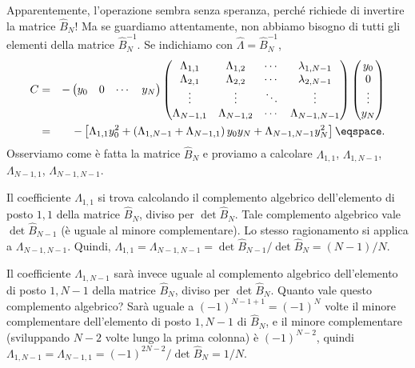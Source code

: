 Apparentemente, l'operazione sembra senza speranza, perch\'e richiede di
invertire la matrice $\hat{B}_{N}$!
Ma se guardiamo attentamente, non abbiamo bisogno di tutti gli elementi della
matrice $\hat{B}_{N}^{-1}$.
Se indichiamo con $\hat{\Lambda} = \hat{B}_{N}^{-1}$, 
\begin{eqnarray*}
C &=&
- \begin{pmatrix}  y_{0} & 0 & \cdots & y_{N} \end{pmatrix} \begin{pmatrix}
\Lambda_{1, 1} & \Lambda_{1, 2}  & \cdots & \lambda_{1, N-1} \\
\Lambda_{2, 1} & \Lambda_{2, 2}  & \cdots & \lambda_{2, N-1} \\
\vdots & \vdots & \ddots & \vdots  \\
\Lambda_{N-1, 1} & \Lambda_{N-1, 2} & \cdots & \Lambda_{N-1, N-1} 
\end{pmatrix} 
\begin{pmatrix} y_{0} \\ 0 \\  \vdots \\ y_{N} \end{pmatrix}  \\
&=& -  \left[ 
\Lambda_{1,1} y_{0}^{2} + \left( \Lambda_{1, N-1} + \Lambda_{N-1, 1} \right)
y_{0} y_{N} + \Lambda_{N-1, N-1} y_{N}^{2} \right] \eqspace .
\end{eqnarray*}
Osserviamo come \`e fatta la matrice $\hat{B}_{N}$ e proviamo a calcolare
$\Lambda_{1,1}$,
$\Lambda_{1,N-1}$,
$\Lambda_{N-1,1}$,
$\Lambda_{N-1, N-1}$.

Il coefficiente $\Lambda_{1,1} $ si trova calcolando il complemento algebrico
dell'elemento di posto $1,1$ della matrice $\hat{B}_{N}$, diviso per $\det
\hat{B}_{N}$. Tale complemento algebrico vale $\det\hat{B}_{N-1}$ (\`e uguale al
minore complementare). Lo stesso ragionamento si applica a $\Lambda_{N-1, N-1}$.
Quindi, $\Lambda_{1,1} = \Lambda_{N-1, N-1} = \det \hat{B}_{N-1} / \det \hat{B}
_{N} = (N-1) / N$.

Il coefficiente $\Lambda_{1, N-1}$ sar\`a invece uguale al complemento algebrico
dell'elemento di posto $1,N-1$ della matrice $\hat{B}_{N}$, diviso per $\det
\hat{B}_{N}$.
Quanto vale questo complemento algebrico?
Sar\`a uguale a $(-1)^{N-1+1} = (-1)^{N}$ volte il minore complementare
dell'elemento di posto $1,N-1$ di $\hat{B}_{N}$, e il minore complementare
(sviluppando $N-2$ volte lungo la prima colonna) \`e $(-1)^{N-2}$, quindi 
$\Lambda_{1, N-1} = \Lambda_{N-1,1} = (-1)^{2N-2} / \det \hat{B}_{N} = 1 / N$.

